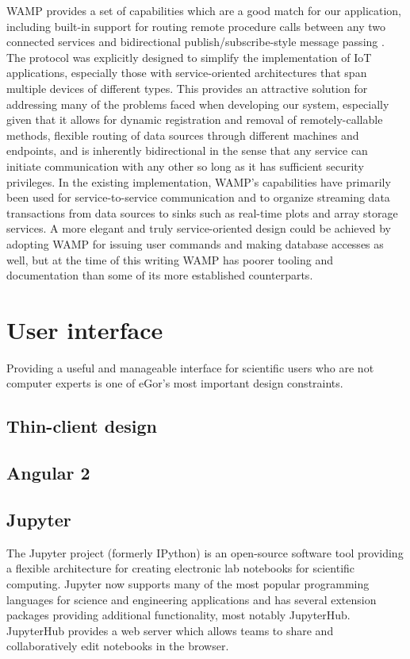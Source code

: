 \documentclass[../thesis]{subfiles}
\begin{document}
\gls{WAMP} provides a set of capabilities which are a good match for
our application, including built-in support for routing remote
procedure calls between any two connected services and bidirectional
publish/subscribe-style message passing \cite{WAMP}. The protocol was
explicitly designed to simplify the implementation of \gls{IoT}
applications, especially those with service-oriented architectures
that span multiple devices of different types.  This provides an
attractive solution for addressing many of the problems faced when
developing our system, especially given that it allows for dynamic
registration and removal of remotely-callable methods, flexible
routing of data sources through different machines and endpoints, and
is inherently bidirectional in the sense that any service can initiate
communication with any other so long as it has sufficient security
privileges. In the existing implementation, \gls{WAMP}'s capabilities
have primarily been used for service-to-service communication and to
organize streaming data transactions from data sources to sinks such
as real-time plots and array storage services. A more elegant and
truly service-oriented design could be achieved by adopting \gls{WAMP}
for issuing user commands and making database accesses as well, but at
the time of this writing \gls{WAMP} has poorer tooling and
documentation than some of its more established counterparts.


\section{User interface}
Providing a useful and manageable interface for scientific users who
are not computer experts is one of eGor's most important design
constraints.

\subsection{Thin-client design}

\subsection{Angular 2}

\subsection{Jupyter}
The Jupyter project (formerly IPython) is an open-source software tool
providing a flexible architecture for creating electronic lab
notebooks for scientific computing. Jupyter now supports many of the
most popular programming languages for science and engineering
applications and has several extension packages providing additional
functionality, most notably JupyterHub. JupyterHub provides a web
server which allows teams to share and collaboratively edit notebooks
in the browser.
\end{document}
